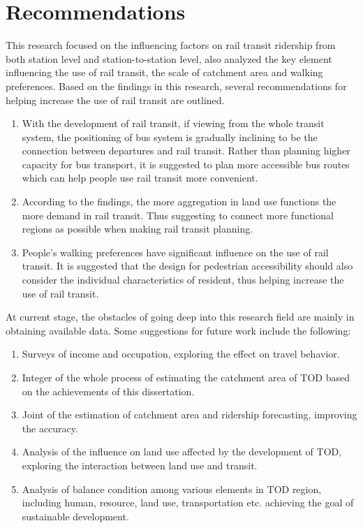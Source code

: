 \section{Recommendations}
This research focused on the influencing factors on rail transit ridership from both station level and station-to-station level, also analyzed the key element influencing the use of rail transit, the scale of catchment area and walking preferences. Based on the findings in this research, several recommendations for helping increase the use of rail transit are outlined.

%
\begin{enumerate}
	\item With the development of rail transit, if viewing from the whole transit system, the positioning of bus system is gradually inclining to be the connection between departures and rail transit. Rather than planning higher capacity for bus transport, it is suggested to plan more accessible bus routes which can help people use rail transit more convenient.
	
	\item According to the findings, the more aggregation in land use functions the more demand in rail transit. Thus suggesting to connect more functional regions as possible when making rail transit planning.
	
	\item People's walking preferences have significant influence on the use of rail transit. It is suggested that the design for pedestrian accessibility should also consider the individual characteristics of resident, thus helping increase the use of rail transit.

\end{enumerate}

At current stage, the obstacles of going deep into this research field are mainly in obtaining available data. Some suggestions for future work include the following:

\begin{enumerate}
	\item Surveys of income and occupation, exploring the effect on travel behavior.
	
	\item Integer of the whole process of estimating the catchment area of TOD based on the achievements of this dissertation.
	
	\item Joint of the estimation of catchment area and ridership forecasting, improving the accuracy.
	
	\item Analysis of the influence on land use affected by the development of TOD, exploring the interaction between land use and transit.
	
	\item Analysis of balance condition among various elements in TOD region, including human, resource, land use, transportation etc. achieving the goal of sustainable development.
\end{enumerate}

\clearpage %
% 
% 
% 